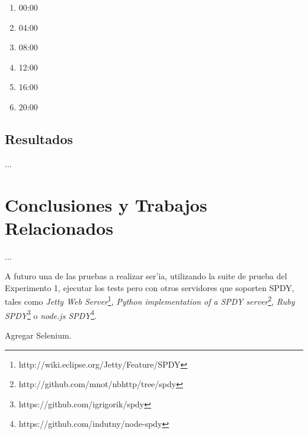 \documentclass[a4paper,11pt,twocolumn]{article}
\begin{document}
\begin{enumerate}
\item 00:00
\item 04:00
\item 08:00
\item 12:00
\item 16:00
\item 20:00
\end{enumerate}

\subsection{Resultados}

...

\section{Conclusiones y Trabajos Relacionados}

...


A futuro una de las pruebas a realizar ser'ia, utilizando la suite de prueba del Experimento 1, ejecutar los tests pero con otros servidores que soporten SPDY, tales como \emph{Jetty Web Server}\footnote{http://wiki.eclipse.org/Jetty/Feature/SPDY}, \emph{Python implementation of a SPDY server}\footnote{http://github.com/mnot/nbhttp/tree/spdy}, \emph{Ruby SPDY}\footnote{https://github.com/igrigorik/spdy} o \emph{node.js SPDY}\footnote{https://github.com/indutny/node-spdy}.

Agregar Selenium.

\nocite{*}

\end{document}
